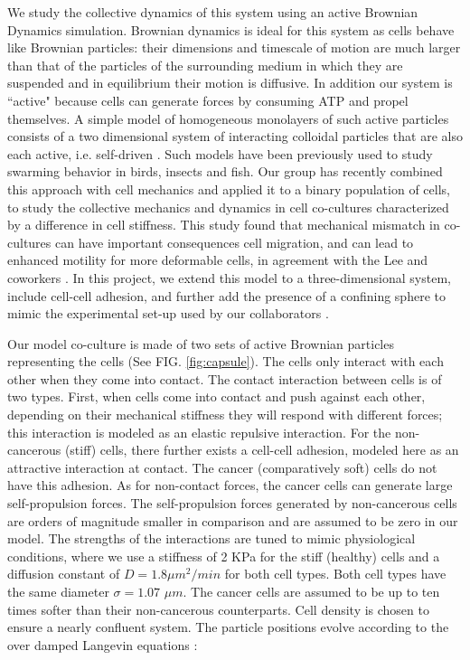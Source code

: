 \documentclass[aps,prb,twocolumn,groupedaddress,nofootinbib,floatfix]{revtex4}
\begin{document}
We study the collective dynamics of this system using an active Brownian Dynamics simulation. Brownian dynamics is ideal for this system as cells behave like Brownian particles: 
their dimensions and timescale of motion are much larger than that of the particles of the surrounding medium in which they are suspended and in equilibrium  their motion is diffusive. In addition
our system is ``active" because cells can generate forces by consuming ATP and propel themselves. A simple model of homogeneous monolayers of such active particles consists
of a two dimensional system of interacting colloidal particles that are also each active, i.e. self-driven \cite{FilyMarchetti,RednerBaskaran}. 
Such models have been previously used to study swarming  behavior \cite{Vicsek} in birds, insects and fish. Our group has recently combined this approach with cell 
mechanics and applied it to a binary population of cells, to study the collective mechanics and dynamics in cell co-cultures characterized by a difference in cell stiffness.
This study found that mechanical mismatch in co-cultures can have important consequences cell migration, and can lead to enhanced motility for more deformable cells\cite{Butcher}, 
in agreement with the Lee and coworkers \cite{Lee}. In this project, we extend this model to a three-dimensional system, include cell-cell adhesion, and further add the presence of a 
confining sphere to mimic the experimental set-up used by our collaborators \cite{Mingming}. 


Our model co-culture is made of two sets of active Brownian particles representing the cells (See FIG. \ref{fig:capsule}). The cells only interact with each other when 
they come into contact. The contact interaction between cells is of two types. First, when cells come into
contact and push against each other, depending on their mechanical stiffness they will respond with different forces; this interaction is modeled as an 
elastic repulsive interaction. For the non-cancerous (stiff) cells, there further exists a cell-cell adhesion,
modeled here as an attractive interaction at contact. The cancer (comparatively soft) cells do not have this adhesion. As for non-contact forces, 
the cancer cells can generate large self-propulsion forces. The self-propulsion forces generated by non-cancerous cells are orders of magnitude smaller in comparison 
and are assumed to be zero in our model. The strengths of the interactions are tuned to mimic physiological
conditions, where we use a stiffness of 2 KPa for the stiff (healthy) cells and a diffusion constant of $D=1.8 \mu m^2/min$ for both cell types. 
Both cell types have the same diameter  $\sigma = 1.07$ $\mu m$.
The cancer cells are assumed to be up to ten times softer than their non-cancerous counterparts. 
Cell density is chosen to ensure a nearly confluent system. The particle positions evolve according to the over damped 
Langevin equations \cite{Lemons,RednerBaskaran,FilyMarchetti,Butcher}: 
\end{document}
